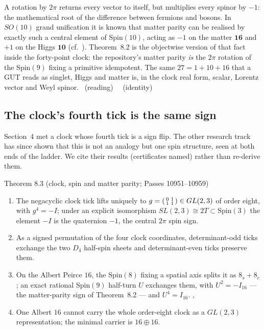 \begin{physical}
A rotation by $2\pi$ returns every vector to itself, but multiplies every spinor by $-1$:
the mathematical root of the difference between fermions and bosons. In $SO(10)$ grand
unification it is known that matter parity can be realised by exactly such a central
element of $\mathrm{Spin}(10)$, acting as $-1$ on the matter $\mathbf{16}$ and $+1$ on the
Higgs $\mathbf{10}$ (cf.\ \cite{Martin1992}). Theorem~8.2 is the objectwise version of that fact
inside the forty-point clock: the repository's matter parity \emph{is} the $2\pi$ rotation
of the $\mathrm{Spin}(9)$ fixing a primitive idempotent. The same $27=1+10+16$ that a
GUT reads as singlet, Higgs and matter is, in the clock real form, scalar, Lorentz vector
and Weyl spinor. \tierB\ (reading) \ \tierC\ (identity)
\end{physical}

\subsection{The clock's fourth tick is the same sign}

Section~4 met a clock whose fourth tick is a sign flip. The other research track has since
shown that this is not an analogy but one spin structure, seen at both ends of the ladder.
We cite their results (certificates named) rather than re-derive them.

\begin{result}{Theorem 8.3 (clock, spin and matter parity; Passes 10951--10959) \hfill \tierC}
\begin{enumerate}[label=(\roman*),leftmargin=1.5em]
\item The negacyclic clock tick lifts uniquely to $g=\begin{psmallmatrix}0&1\\1&1\end{psmallmatrix}\in GL(2,3)$
      of order eight, with $g^4=-I$; under an explicit isomorphism $SL(2,3)\cong 2T\subset
      \mathrm{Spin}(3)$ the element $-I$ is the quaternion $-1$, the central $2\pi$ spin sign.
\item As a signed permutation of the four clock coordinates, determinant-odd ticks exchange
      the two $D_4$ half-spin sheets and determinant-even ticks preserve them.
\item On the Albert Peirce $16$, the $\mathrm{Spin}(8)$ fixing a spatial axis splits it as
      $8_s+8_c$; an exact rational $\mathrm{Spin}(9)$ half-turn $U$ exchanges them, with
      $U^2=-I_{16}$ --- the matter-parity sign of Theorem~8.2 --- and $U^4=I_{16}$.
      ,
\item One Albert $16$ cannot carry the whole order-eight clock as a $GL(2,3)$ representation;
      the minimal carrier is $16\oplus16$.
\end{enumerate}
\end{result}


